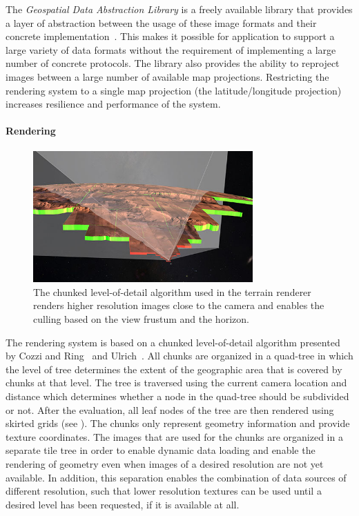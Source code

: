 The \emph{Geospatial Data Abstraction Library} is a freely available library that provides a layer of abstraction between the usage of these image formats and their concrete implementation~\cite{warmerdam2008geospatial}.  This makes it possible for application to support a large variety of data formats without the requirement of implementing a large number of concrete protocols.  The library also provides the ability to reproject images between a large number of available map projections.  Restricting the rendering system to a single map projection (the latitude/longitude projection) increases resilience and performance of the system.


\paragraph{Rendering} \label{contributions:astro:gb:rendering}
\begin{figure}
\centering
\includegraphics[width=0.75\textwidth]{figures/contributions/gb/culling.png}
\caption{The chunked level-of-detail algorithm used in the terrain renderer renders higher resolution images close to the camera and enables the culling based on the view frustum and the horizon.}
\label{contributions:astro:gb:culling}
\end{figure}

The rendering system is based on a chunked level-of-detail algorithm presented by Cozzi and Ring~\cite{cozzi20113d} and Ulrich~\cite{ulrich2002rendering}.  All chunks are organized in a quad-tree in which the level of tree determines the extent of the geographic area that is covered by chunks at that level.  The tree is traversed using the current camera location and distance which determines whether a node in the quad-tree should be subdivided or not.  After the evaluation, all leaf nodes of the tree are then rendered using skirted grids (see ).  The chunks only represent geometry information and provide texture coordinates.  The images that are used for the chunks are organized in a separate tile tree in order to enable dynamic data loading and enable the rendering of geometry even when images of a desired resolution are not yet available.  In addition, this separation enables the combination of data sources of different resolution, such that lower resolution textures can be used until a desired level has been requested, if it is available at all.

